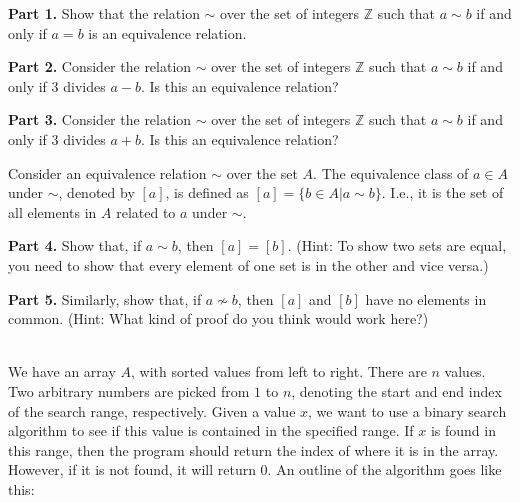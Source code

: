 \documentclass[11pt]{article}
\newif\ifsolutions
\begin{document}
\begin{qunlist}
\textbf{Part 1.} Show that the relation $\sim$ over the set of integers $\mathbb{Z}$ such that $a\sim b$ if and only if $a=b$ is an equivalence relation.

\ifsolutions
\textbf{Solutions:} One just needs to go over them one by one. Clearly $a=a$ and if $a=b$ then $b=a$. Also if $a=b$ and $b=c$ then $a=c$.
\fi

\textbf{Part 2.} Consider the relation $\sim$ over the set of integers $\mathbb{Z}$ such that $a\sim b$ if and only if 3 divides $a-b$. Is this an equivalence relation?

\ifsolutions
\textbf{Solutions:} It is. It is reflexive since $3|0$. Symmetric because if $a\sim b$ then $3|a-b$ and therefore $3|-(a-b)=b-a$. It is also transitive since $3|a-b$ and $3|b-c$ mean that $3|(a-b)+(b-c)=a-c$.
\fi

\textbf{Part 3.} Consider the relation $\sim$ over the set of integers $\mathbb{Z}$ such that $a\sim b$ if and only if 3 divides $a+b$. Is this an equivalence relation?

\ifsolutions
\textbf{Solutions:} No it is not reflexive. If $a=2$ then $3 {\not|} 2+2$.
\fi

Consider an equivalence relation $\sim$ over the set $A$. The equivalence class of $a \in A$ under $\sim$, denoted by $[a]$, is defined as $[a] = \{b\in A | a\sim b\}$. 
I.e., it is the set of all elements in $A$ related to $a$ under $\sim$.

\textbf{Part 4.} Show that, if $a\sim b$, then $[a] = [b]$. (Hint: To show two sets are equal, you need to show that every element of one set is in the other and vice versa.) 

\ifsolutions
\textbf{Solutions:} If $c\in[a]$ then $a\sim c$ and since $a\sim b$, then $b\sim c$ and therefore $c\in[b]$. The reverse is the same.
\fi

\textbf{Part 5.} Similarly, show that, if $a\not\sim b$, then $[a]$ and $[b]$ have no elements in common. (Hint: What kind of proof do you think would work here?)

\ifsolutions
\textbf{Solutions:} If $c\in[a], [b]$, then $a\sim c$ and $b\sim c$ which means that $a\sim b$, which means that $a\sim b$, contradiction.
\fi

 \\
We have an array $A$, with sorted values from left to right. There are $n$ values. Two arbitrary numbers are picked from $1$ to $n$, denoting the start and end index of the search range, respectively. Given a value $x$, we want to use a binary search algorithm to see if this value is contained in the specified range. If $x$ is found in this range, then the program should return the index of where it is in the array. However, if it is not found, it will return 0. An outline of the algorithm goes like this: 


\end{qunlist}
\end{document}
